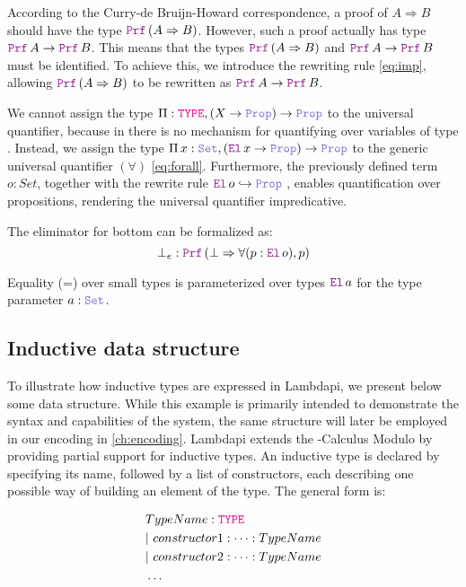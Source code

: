 According to the Curry-de Bruijn-Howard correspondence, a proof of $A \Rightarrow B$ should have the type $\prf\,(A \Rightarrow B)$.
However, such a proof actually has type $\prf\,A \ra \prf\,B$. This means that the types $\prf\,(A \Rightarrow B)$ and $\prf\,A \ra \prf\,B$ must be identiﬁed.
To achieve this, we introduce the rewriting rule \cref{eq:imp}, allowing $\prf\,(A \Rightarrow B)$ to be rewritten as $\prf\,A \ra \prf\,B$.

We cannot assign the type $\Pi : \type, (X \ra \prop) \ra \prop$ to the universal quantifier, because in \lpm{} there is no mechanism for quantifying over variables of type \type.
Instead, we assign the type $\Pi\,x:\set{},(\el\,x \ra \prop) \ra \prop$ to the generic universal quantiﬁer $(\forall)$ \cref{eq:forall}.
Furthermore, the previously defined term $o: Set$, together with the rewrite rule $\el\,o\index{o}  \hookrightarrow \prop$
, enables quantification over propositions, rendering the universal quantifier impredicative.

\begin{example}
The eliminator for bottom can be formalized as:
\[ \bot_e : \prf\,(\bot \Rightarrow \forall (p: \el\,o), p) \]
\end{example}

Equality (=) over small types is parameterized over types $\el\,a$ for the type parameter $a : \set{}$.

\subsection{Inductive data structure}

To illustrate how inductive types are expressed in Lambdapi, we present below some data structure.
While this example is primarily intended to demonstrate the syntax and capabilities of the system, the same structure will later be employed in our encoding in \cref{ch:encoding}.
Lambdapi extends the \lpm-Calculus Modulo by providing partial support for inductive types.
An inductive type is declared by specifying its name, followed by a list of constructors, each describing one possible way of building an element of the type.
The general form is:

\begin{align*}
&TypeName : \type\\
&|~constructor1 : \dots : TypeName \\
&|~constructor2 : \dots : TypeName\\
&\dots
\end{align*}

